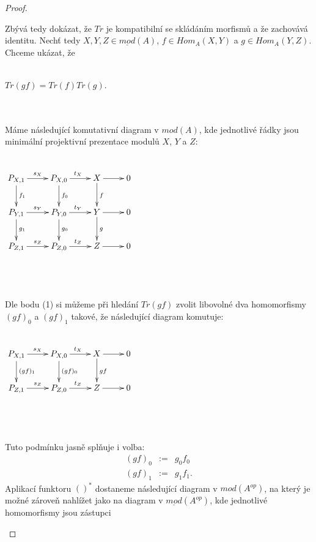 \begin{proof}
\begin{description}
           Zbývá tedy dokázat, že $Tr$ je kompatibilní se skládáním morfismů a 
           že zachovává identitu. Nechť tedy $X,Y,Z\in \underline{mod}(A)$, $f\in Hom_A(X,Y)$ 
           a $g\in Hom_A(Y,Z)$. Chceme ukázat, že 
           \\\\\centerline{$Tr(gf)=Tr(f)Tr(g)$.}\\\\
           Máme následující  komutativní diagram v $mod(A)$, kde jednotlivé 
           řádky jsou minimální  projektivní prezentace modulů $X$, $Y$ a $Z$:
           \\\\\centerline{$\xymatrix{
                P_{X,1} \ar[r]^{s_X} \ar[d]^{f_1}
             & P_{X,0} \ar[r]^{t_X} \ar[d]^{f_0}
             & X \ar[r]  \ar[d]^{f}
             & 0 \\
                P_{Y,1} \ar[r]^{s_Y} \ar[d]^{g_1}
             & P_{Y,0} \ar[r]^{t_Y} \ar[d]^{g_0}
             & Y \ar[r]  \ar[d]^{g}
             & 0 \\
                P_{Z,1} \ar[r]^{s_Z} 
             & P_{Z,0} \ar[r]^{t_Z}
             & Z \ar[r]
             & 0
           }$} \\\\\\
           Dle bodu (1) si můžeme při hledání $Tr(gf)$ zvolit libovolné dva 
           homomorfismy $(gf)_0$ a $(gf)_1$ takové, že následující diagram 
           komutuje:
           \\\\\centerline{$\xymatrix{
                P_{X,1} \ar[r]^{s_X} \ar[d]^{(gf)_1}
             & P_{X,0} \ar[r]^{t_X} \ar[d]^{(gf)_0}
             & X \ar[r]  \ar[d]^{gf}
             & 0 \\
                P_{Z,1} \ar[r]^{s_Z} 
             & P_{Z,0} \ar[r]^{t_Z}
             & Z \ar[r]
             & 0
           }$} \\\\\\
           Tuto podmínku jasně splňuje i volba:
           \begin{eqnarray}
            (gf)_0 &:=& g_0f_0 \nonumber \\
            (gf)_1 &:=& g_1f_1.\nonumber
           \end{eqnarray}
           Aplikací funktoru $()^*$ dostaneme následující diagram v $mod(A^{op})$, 
           na který je možné zároveň nahlížet jako na diagram v 
           $\underline{mod}(A^{op})$, kde jednotlivé homomorfismy jsou zástupci 

\end{description}
\end{proof}
